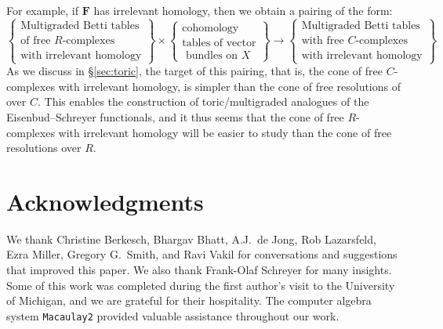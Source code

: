 \documentclass[12pt]{amsart}
\theoremstyle{definition}
\theoremstyle{remark}
\newcommand{\FF}{\mathbf{F}}
\begin{document}
For example, if $\FF$ has irrelevant homology, then we obtain a pairing of the form:
\begin{equation*}%
\label{eqn:multipairing}
%
\left\{\begin{matrix}
\text{Multigraded Betti tables} \\ \text{of free $R$-complexes}\\
\text{with irrelevant homology}\end{matrix}\right\}
%
\times 
%
\left\{\begin{matrix}
\text{cohomology }\\
\text{tables of vector}\\
\text{ bundles on } X
\end{matrix}\right\}
%
\longrightarrow
\left\{\begin{matrix}
\text{Multigraded Betti tables} \\ \text{with  free $C$-complexes}\\
\text{with irrelevant homology}
\end{matrix}\right\}
\end{equation*}
As we discuss in \S\ref{sec:toric}, the target of this pairing, that is, the cone of free $C$-complexes with irrelevant homology, is simpler than the cone of free resolutions of over $C$.  This enables the construction of toric/multigraded analogues of the Eisenbud--Schreyer functionals, and it thus seems that the cone of free $R$-complexes with irrelevant homology will be easier to study than the cone of free resolutions over $R$. 

\section*{Acknowledgments}
We thank Christine Berkesch, Bhargav Bhatt, A.J.\ de Jong, Rob Lazarsfeld, Ezra Miller, Gregory G.\ Smith, and Ravi Vakil for conversations and suggestions that improved this paper.  We also thank Frank-Olaf Schreyer for many insights.
Some of this work was completed during the first author's visit to the University of Michigan, and we are grateful for their hospitality.  The computer
algebra system \texttt{Macaulay2} \cite{M2} provided valuable assistance throughout our work.
\end{document}
